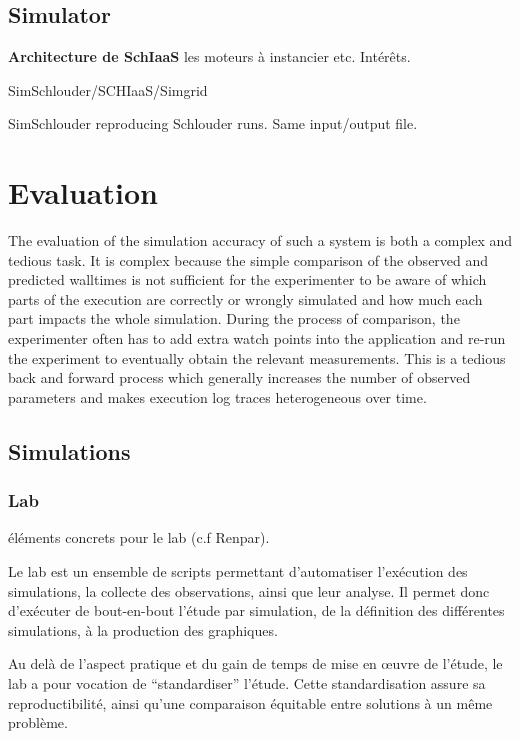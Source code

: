 \subsection{Simulator}

\textbf{Architecture de SchIaaS} les moteurs à instancier etc. Intérêts.


SimSchlouder/SCHIaaS/Simgrid

SimSchlouder reproducing Schlouder runs. Same input/output file.






\section{Evaluation}

The evaluation of the simulation accuracy of such a system is both a complex and
tedious task.  It  is complex because the simple comparison  of the observed and
predicted walltimes is not sufficient for  the experimenter to be aware of which
parts of the execution are correctly or wrongly simulated and how much each part
impacts the whole simulation. During the process of comparison, the experimenter
often  has  to add  extra  watch  points into  the  application  and re-run  the
experiment to  eventually obtain the  relevant measurements.  This is  a tedious
back  and forward  process  which  generally increases  the  number of  observed
parameters and makes execution log traces heterogeneous over time.


\subsection{Simulations}

\subsubsection{Lab}

éléments concrets pour le lab (c.f Renpar).

Le  lab est  un ensemble  de  scripts permettant  d'automatiser l'exécution  des
simulations, la  collecte des  observations, ainsi que  leur analyse.  Il permet
donc d'exécuter  de bout-en-bout  l'étude par simulation,  de la  définition des
différentes simulations, à la production des graphiques.

Au delà de l'aspect pratique et du gain de temps de mise en œuvre de l'étude, le
lab a pour vocation de ``standardiser'' l'étude. Cette standardisation assure sa
reproductibilité, ainsi qu'une  comparaison équitable entre solutions  à un même
problème.

